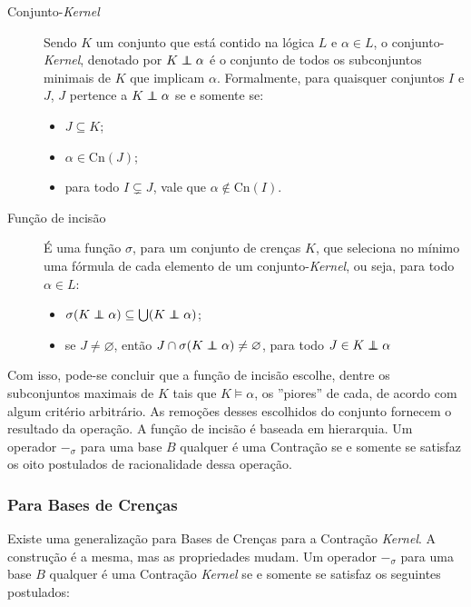 \begin{description}
	\item[Conjunto-\textit{Kernel}] Sendo $ K $ um conjunto que está contido na lógica $ L $ e $ \alpha \in L $, o conjunto-\textit{Kernel}, denotado por $ K \kcont \alpha $ é o conjunto de todos os subconjuntos minimais de $ K $ que implicam $ \alpha $. Formalmente, para quaisquer conjuntos $ I $ e $ J $, $ J $ pertence a $ K \kcont \alpha $ se e somente se:
	\begin{itemize}
		\item $ J \subseteq K $;
		\item $ \alpha \in \text{Cn}(J) $;
		\item para todo $ I \subsetneq J $, vale que $ \alpha \notin \text{Cn}(I) $.
	\end{itemize} 	
	\item[Função de incisão] É uma função $ \sigma $, para um conjunto de crenças $ K $, que seleciona no mínimo uma fórmula de cada elemento de um conjunto-\textit{Kernel}, ou seja, para todo $ \alpha \in L $:
	\begin{itemize}
		\item $ \sigma (K \kcont \alpha) \subseteq \bigcup(K \kcont \alpha) $;
		\item se $ J \neq \varnothing $, então $ J \cap \sigma(K \kcont \alpha) \neq \varnothing $, para todo $ J \in K \kcont \alpha $
	\end{itemize}
\end{description}

Com isso, pode-se concluir que a função de incisão escolhe, dentre os subconjuntos maximais de $ K $ tais que $ K \models \alpha $, os ''piores'' de cada, de acordo com algum critério arbitrário. As remoções desses escolhidos do conjunto fornecem o resultado da operação. A função de incisão é baseada em hierarquia. Um operador $ -_{\sigma} $ para uma base $ B $ qualquer é uma Contração se e somente se satisfaz os oito postulados de racionalidade dessa operação.

\subsubsection{Para Bases de Crenças}

Existe uma generalização para Bases de Crenças para a Contração \textit{Kernel}. A construção é a mesma, mas as propriedades mudam. Um operador $ -_{\sigma} $ para uma base $ B $ qualquer é uma Contração \textit{Kernel} se e somente se satisfaz os seguintes postulados:

